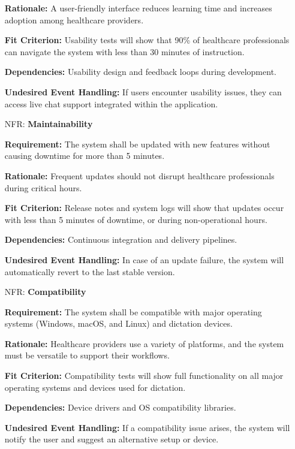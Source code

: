 \documentclass[12pt]{article}
\newcounter{nfrnum} %
\begin{document}
\begin{itemize}
    \textbf{Rationale:} A user-friendly interface reduces learning time and increases adoption among healthcare providers.  
  
    \textbf{Fit Criterion:} Usability tests will show that 90\% of healthcare professionals can navigate the system with less than 30 minutes of instruction.  
  
    \textbf{Dependencies:} Usability design and feedback loops during development.  
  
    \textbf{Undesired Event Handling:} If users encounter usability issues, they can access live chat support integrated within the application.

\item[NFR\refstepcounter{nfrnum}\thenfrnum \label{NFR_Maintainability}:] \textbf{Maintainability}  

    \textbf{Requirement:} The system shall be updated with new features without causing downtime for more than 5 minutes.  
  
    \textbf{Rationale:} Frequent updates should not disrupt healthcare professionals during critical hours.  
  
    \textbf{Fit Criterion:} Release notes and system logs will show that updates occur with less than 5 minutes of downtime, or during non-operational hours.  
  
    \textbf{Dependencies:} Continuous integration and delivery pipelines.  
  
    \textbf{Undesired Event Handling:} In case of an update failure, the system will automatically revert to the last stable version.

\item[NFR\refstepcounter{nfrnum}\thenfrnum \label{NFR_Compatibility}:] \textbf{Compatibility}  

    \textbf{Requirement:} The system shall be compatible with major operating systems (Windows, macOS, and Linux) and dictation devices.  
  
    \textbf{Rationale:} Healthcare providers use a variety of platforms, and the system must be versatile to support their workflows.  
  
    \textbf{Fit Criterion:} Compatibility tests will show full functionality on all major operating systems and devices used for dictation.  
  
    \textbf{Dependencies:} Device drivers and OS compatibility libraries.  
  
    \textbf{Undesired Event Handling:} If a compatibility issue arises, the system will notify the user and suggest an alternative setup or device.


\end{itemize}
\end{document}
